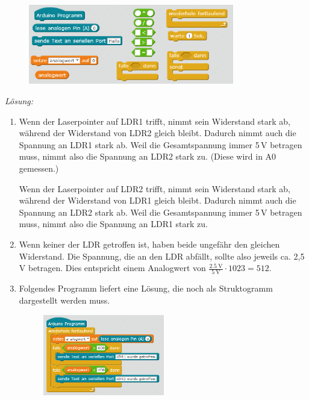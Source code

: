 \documentclass[ngerman, 11pt]{scrreprt}
\begin{document}
\begin{aufgabe}
		\begin{figure}[H]
			\centering
			\includegraphics[width=0.8\textwidth]{../pics/befehle-fuer-ldr-in-reihe.png}
		\end{figure}
	\end{aufgabe}

	\bigskip
	\emph{Lösung:}
	
	\begin{enumerate}[label=\alph*), itemsep=0mm, parsep=0mm]
		\item Wenn der Laserpointer auf LDR1 trifft, nimmt sein Widerstand stark ab, während der Widerstand von LDR2 gleich bleibt. Dadurch nimmt auch die Spannung an LDR1 stark ab. Weil die Gesamtspannung immer 5\,V betragen muss, nimmt also die Spannung an LDR2 stark zu. (Diese wird in A0 gemessen.)
		
		Wenn der Laserpointer auf LDR2 trifft, nimmt sein Widerstand stark ab, während der Widerstand von LDR1 gleich bleibt. Dadurch nimmt auch die Spannung an LDR2 stark ab. Weil die Gesamtspannung immer 5\,V betragen muss, nimmt also die Spannung an LDR1 stark zu. 
		
		\item Wenn keiner der LDR getroffen ist, haben beide ungefähr den gleichen Widerstand. Die Spannung, die an den LDR abfällt, sollte also jeweils ca. 2,5\,V betragen. Dies entspricht einem Analogwert von $\frac{\SI{2,5}{\volt}}{\SI{5}{\volt}}\cdot 1023 =512$.
		
		\item Folgendes Programm liefert eine Lösung, die noch als Struktogramm dargestellt werden muss.
		
		\begin{figure}[H]
			\centering
			\includegraphics[width=0.5\textwidth]{../pics/programm-ldr-in-reihe.png}
		\end{figure}
	\end{enumerate}
	
\end{document}
